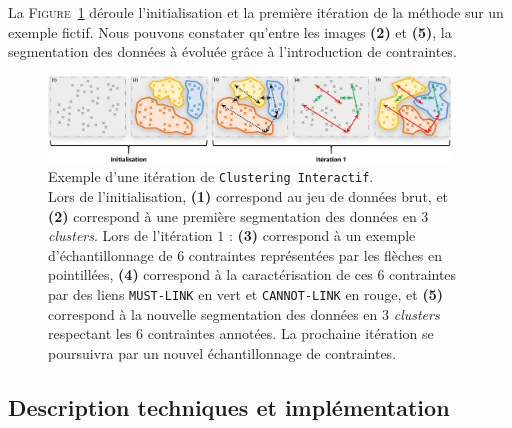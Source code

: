 		\begin{leftBarExamples}
			La \textsc{Figure~\ref{figure:3.2.2-DESCRIPTION-THEORIQUE-DETAILLEE-EXEMPLE}} déroule l'initialisation et la première itération de la méthode sur un exemple fictif.
			Nous pouvons constater qu'entre les images \textbf{(2)} et \textbf{(5)}, la segmentation des données à évoluée grâce à l'introduction de contraintes.
		
			\begin{figure}[H]
				\centering
				\includegraphics[width=0.95\textwidth]{figures/example-iteration-clustering-interatif}
				\caption{
					Exemple d'une itération de \texttt{Clustering Interactif}. \\
					Lors de l'initialisation,
					\textbf{(1)} correspond au jeu de données brut,
					et \textbf{(2)} correspond à une première segmentation des données en $3$ \textit{clusters}.
					Lors de l'itération $1$ :
					\textbf{(3)} correspond à un exemple d'échantillonnage de $6$ contraintes représentées par les flèches en pointillées,
					\textbf{(4)} correspond à la caractérisation de ces $6$ contraintes par des liens \texttt{MUST-LINK} en vert et \texttt{CANNOT-LINK} en rouge,
					et \textbf{(5)} correspond à la nouvelle segmentation des données en $3$ \textit{clusters} respectant les $6$ contraintes annotées.
					La prochaine itération se poursuivra par un nouvel échantillonnage de contraintes.
				}
				\label{figure:3.2.2-DESCRIPTION-THEORIQUE-DETAILLEE-EXEMPLE}
			\end{figure}
		\end{leftBarExamples}
	
	
	\subsection{Description techniques et implémentation}
	\label{section:3.2.3-DESCRIPTION-TECHNIQUE-IMPLEMENTATION}
	
